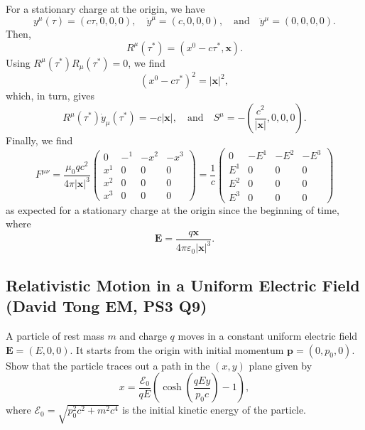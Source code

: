 For a stationary charge at the origin, we have
\begin{equation}
    y^\mu(\tau) = (c\tau ,0,0,0), \quad \dot{y}^\mu=(c,0,0,0), \quad \text{and}\quad \ddot{y}^\mu = (0,0,0,0).
\end{equation}
Then, 
\begin{equation}
    R^\mu(\tau^*) = (x^0-c\tau^*,\mathbf{x}).
\end{equation}
Using $R^\mu(\tau^*)R_\mu(\tau^*)=0$, we find
\begin{equation}
    (x^0-c\tau^*)^2 = |\mathbf{x}|^2,
\end{equation}
which, in turn, gives
\begin{equation}
    R^\mu(\tau^*)\dot{y}_\mu(\tau^*) = -c|\mathbf{x}|, \quad \text{and} \quad S^\mu = -\left(\frac{c^2}{|\mathbf{x}|},0,0,0\right).
\end{equation}
Finally, we find
\begin{equation}
    \boxed{F^{\mu\nu}=\frac{\mu_0 qc^2}{4\pi |\mathbf{x}|^3}\begin{pmatrix}
    0   & -^1 & -x^2 & -x^3 \\
    x^1 & 0   & 0   & 0   \\
    x^2 & 0   & 0   & 0   \\
    x^3 & 0   & 0   & 0
  \end{pmatrix} = \frac{1}{c}\begin{pmatrix}
    0   & -E^1 & -E^2 & -E^3 \\
    E^1 & 0   & 0   & 0   \\
    E^2 & 0   & 0   & 0   \\
    E^3 & 0   & 0   & 0
  \end{pmatrix}}
\end{equation}
as expected for a stationary charge at the origin since the beginning of time, where
\begin{equation}
    \mathbf{E} = \frac{q\mathbf{x}}{4\pi \varepsilon_0|\mathbf{x}|^3}.
\end{equation}

\subsection{Relativistic Motion in a Uniform Electric Field (David Tong EM, PS3 Q9)}
\label{sec:relativistic-electric}

A particle of rest mass $m$ and charge $q$ moves in a constant
uniform electric field $\mathbf{E} = (E,0,0)$. It starts from the origin with
initial momentum $\mathbf{p} = (0,p_0,0)$. Show that the particle traces out
a path in the $(x,y)$ plane given by
\begin{equation}
  x = \frac{\mathcal{E}_0}{qE}\left(\cosh\!\left(\frac{qEy}{p_0 c}\right)-1\right),
\end{equation}
where $\mathcal{E}_0 = \sqrt{p_0^2c^2 + m^2c^4}$ is the initial kinetic energy
of the particle.

